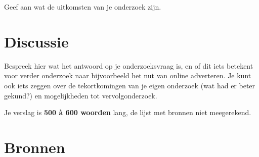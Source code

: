 \documentclass[12pt]{article}
\begin{document}
Geef aan wat de uitkomsten van je onderzoek zijn.

\section*{Discussie}

Bespreek hier wat het antwoord op je onderzoeksvraag is, en of dit iets betekent voor verder onderzoek naar bijvoorbeeld het nut van online adverteren. Je kunt ook iets zeggen over de tekortkomingen van je eigen onderzoek (wat had er beter gekund?) en mogelijkheden tot vervolgonderzoek. 

Je verslag is  \textbf{500 \`a 600 woorden} lang,  de lijst met bronnen niet meegerekend. 

\newpage
\section*{Bronnen}
\end{document}
